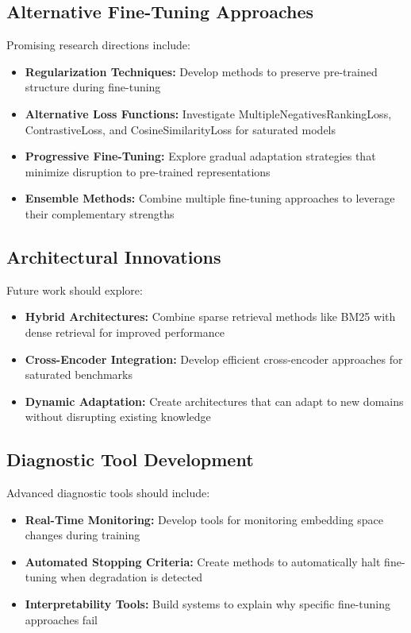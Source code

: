 \subsection{Alternative Fine-Tuning Approaches}

Promising research directions include:

\begin{itemize}
\item \textbf{Regularization Techniques:} Develop methods to preserve pre-trained structure during fine-tuning
\item \textbf{Alternative Loss Functions:} Investigate MultipleNegativesRankingLoss, ContrastiveLoss, and CosineSimilarityLoss \cite{sbert_losses} for saturated models
\item \textbf{Progressive Fine-Tuning:} Explore gradual adaptation strategies that minimize disruption to pre-trained representations
\item \textbf{Ensemble Methods:} Combine multiple fine-tuning approaches to leverage their complementary strengths
\end{itemize}

\subsection{Architectural Innovations}

Future work should explore:

\begin{itemize}
\item \textbf{Hybrid Architectures:} Combine sparse retrieval methods like BM25 with dense retrieval for improved performance
\item \textbf{Cross-Encoder Integration:} Develop efficient cross-encoder approaches for saturated benchmarks
\item \textbf{Dynamic Adaptation:} Create architectures that can adapt to new domains without disrupting existing knowledge
\end{itemize}

\subsection{Diagnostic Tool Development}

Advanced diagnostic tools should include:

\begin{itemize}
\item \textbf{Real-Time Monitoring:} Develop tools for monitoring embedding space changes during training
\item \textbf{Automated Stopping Criteria:} Create methods to automatically halt fine-tuning when degradation is detected
\item \textbf{Interpretability Tools:} Build systems to explain why specific fine-tuning approaches fail
\end{itemize}

